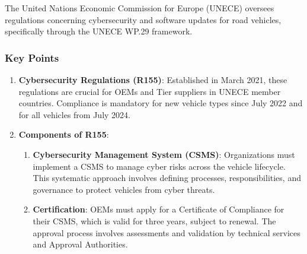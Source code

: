 The United Nations Economic Commission for Europe (UNECE) oversees regulations concerning cybersecurity and software updates for road vehicles, specifically through the UNECE WP.29 framework.

\subsubsection{Key Points}\label{subsubsec:key-points}
\begin{enumerate}
    \item \textbf{Cybersecurity Regulations (R155)}: Established in March 2021, these regulations are crucial for OEMs and Tier suppliers in UNECE member countries.
    Compliance is mandatory for new vehicle types since July 2022 and for all vehicles from July 2024.
    \item \textbf{Components of R155}:
    \begin{enumerate}
        \item \textbf{Cybersecurity Management System (CSMS)}: Organizations must implement a CSMS to manage cyber risks across the vehicle lifecycle.
        This systematic approach involves defining processes, responsibilities, and governance to protect vehicles from cyber threats.
        \item \textbf{Certification}: OEMs must apply for a Certificate of Compliance for their CSMS, which is valid for three years, subject to renewal.
        The approval process involves assessments and validation by technical services and Approval Authorities.
    \end{enumerate}
\end{enumerate}

